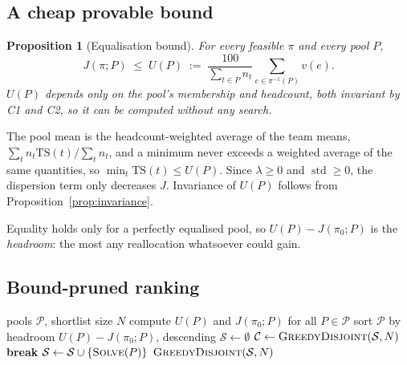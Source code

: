 \documentclass[conference]{IEEEtran}
\newtheorem{proposition}{Proposition}
\newcommand{\vv}{v}
\begin{document}
\subsection{A cheap provable bound}

\begin{proposition}[Equalisation bound]\label{prop:bound}
For every feasible $\pi$ and every pool $P$,
\begin{equation}
J(\pi;P)\;\le\; U(P) \;:=\; \frac{100}{\sum_{t\in P} n_t}\sum_{e\in\pi^{-1}(P)}\vv(e).
\label{eq:bound}
\end{equation}
$U(P)$ depends only on the pool's membership and headcount, both invariant by C1
and C2, so it can be computed without any search.
\end{proposition}

\begin{IEEEproof}
The pool mean is the headcount-weighted average of the team means,
$\sum_t n_t \mathrm{TS}(t)/\sum_t n_t$, and a minimum never exceeds a weighted
average of the same quantities, so $\min_t \mathrm{TS}(t)\le U(P)$. Since
$\lambda\ge 0$ and $\operatorname{std}\ge 0$, the dispersion term only decreases
$J$. Invariance of $U(P)$ follows from Proposition~\ref{prop:invariance}.
\end{IEEEproof}

Equality holds only for a perfectly equalised pool, so $U(P)-J(\pi_0;P)$ is the
\emph{headroom}: the most any reallocation whatsoever could gain.

\subsection{Bound-pruned ranking}

\begin{algorithm}[t]
\caption{Bound-pruned shortlist}
\label{alg:prune}
\begin{algorithmic}[1]
\Require pools $\mathcal{P}$, shortlist size $N$
\State compute $U(P)$ and $J(\pi_0;P)$ for all $P\in\mathcal{P}$ 
\State sort $\mathcal{P}$ by headroom $U(P)-J(\pi_0;P)$, descending
\State $\mathcal{S}\gets\emptyset$ 
  \State $\mathcal{C}\gets\textsc{GreedyDisjoint}(\mathcal{S},N)$
     \State \textbf{break} 
  \EndIf
  \State $\mathcal{S}\gets\mathcal{S}\cup\{\textsc{Solve}(P)\}$
\EndFor
\State \Return $\textsc{GreedyDisjoint}(\mathcal{S},N)$
\end{algorithmic}
\end{algorithm}
\end{document}
